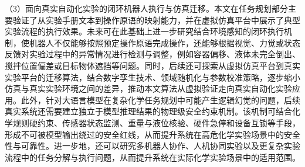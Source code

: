 （3）面向真实自动化实验的闭环机器人执行与仿真迁移。本文在任务规划部分主要验证了从实验手册文本到操作原语的映射能力，并在虚拟仿真平台中展示了典型实验流程的执行效果。未来可在此基础上进一步研究结合环境感知的闭环执行机制，使机器人不仅能够按照预定操作原语完成操作，还能够根据视觉、力觉或状态反馈对实验过程中的异常情况进行检测与调整，例如容器偏移、液体未完全倒出、搅拌位置偏差或目标物体遮挡等问题。同时，后续还可探索从虚拟仿真平台到真实实验平台的迁移算法，结合数字孪生技术、领域随机化与参数校准策略，逐步缩小仿真与真实实验环境之间的差异，推动本文算法从虚拟验证走向真实自动化实验应用。此外，针对大语言模型在复杂化学任务规划中可能产生逻辑幻觉的问题，后续真实系统还需要建立独立于模型推理结果的物理级安全约束机制。该机制可结合化学规则硬约束、传感器状态监测、重量与液位核验、硬件急停和设备互锁等手段，形成不可被模型输出绕过的安全红线，从而提升系统在高危化学实验场景中的安全性与可靠性。进一步地，还可以研究多机器人协作、人机协同实验以及更复杂实验流程中的任务分解与执行问题，从而提升系统在实际化学实验场景中的适用范围。

